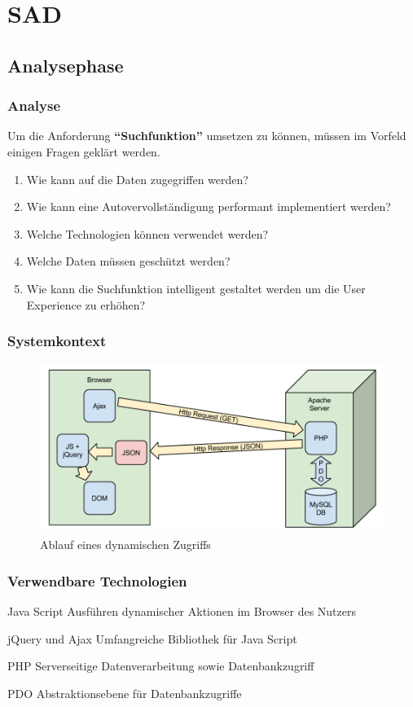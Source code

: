 \section{SAD}
\subsection{Analysephase}
\begin{frame} 
  \frametitle{Analyse} 
  Um die Anforderung \textbf{``Suchfunktion''} umsetzen zu können, müssen im Vorfeld einigen Fragen geklärt werden. 
   \begin{enumerate}
   \item Wie kann auf die Daten zugegriffen werden?
   \item Wie kann eine Autovervollständigung performant implementiert werden?
   \item Welche Technologien können verwendet werden?
   \item Welche Daten müssen geschützt werden?
   \item Wie kann die Suchfunktion intelligent gestaltet werden um die User 
   Experience zu erhöhen?
  \end{enumerate}
\end{frame}

\begin{frame} 
  \frametitle{Systemkontext}
  \begin{figure}[htbp]
\centering
\includegraphics[width=1.0\textwidth]{./chapters/SAD_dynAccess.png}
\caption{Ablauf eines dynamischen Zugriffs}
\label{fig:SAD_dynAccess}
\end{figure}
\end{frame}

\begin{frame} 
  \frametitle{Verwendbare Technologien}
  \begin{block}{Java Script}
    Ausführen dynamischer Aktionen im Browser des Nutzers
  \end{block}
  \begin{block}{jQuery und Ajax}
    Umfangreiche Bibliothek für Java Script
  \end{block}
  \begin{block}{PHP}
    Serverseitige Datenverarbeitung sowie Datenbankzugriff
  \end{block}
  \begin{block}{PDO}
    Abstraktionsebene für Datenbankzugriffe
  \end{block}
\end{frame}

